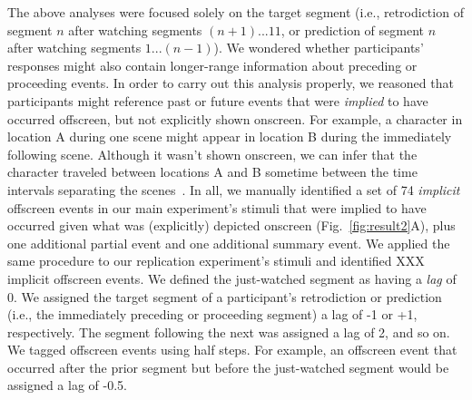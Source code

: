\documentclass[10pt]{article}
\begin{document}
The above analyses were focused solely on the target segment (i.e., retrodiction of segment $n$ after watching segments $(n+1)... 11$, or prediction of segment $n$ after watching segments $1 ...(n-1)$). We wondered whether participants' responses might also contain longer-range information about preceding or proceeding events. In order to carry out this analysis properly, we reasoned that participants might reference past or future events that were \textit{implied} to have occurred offscreen, but not explicitly shown onscreen. For example, a character in location A during one scene might appear in location B during the immediately following scene. Although it wasn't shown onscreen, we can infer that the character traveled between locations A and B sometime between the time intervals separating the scenes~\citep{Bord08}. In all, we manually identified a set of 74 \textit{implicit} offscreen events in our main experiment's stimuli that were implied to have occurred given what was (explicitly) depicted onscreen (Fig.~\ref{fig:result2}A), plus one additional partial event and one additional summary event. We applied the same procedure to our replication experiment's stimuli and identified XXX implicit offscreen events. We defined the just-watched segment as having a \textit{lag} of 0. We assigned the target segment of a participant's retrodiction or prediction (i.e., the immediately preceding or proceeding segment) a lag of -1 or +1, respectively. The segment following the next was assigned a lag of 2, and so on. We tagged offscreen events using half steps. For example, an offscreen event that occurred after the prior segment but before the just-watched segment would be assigned a lag of -0.5.
\end{document}
